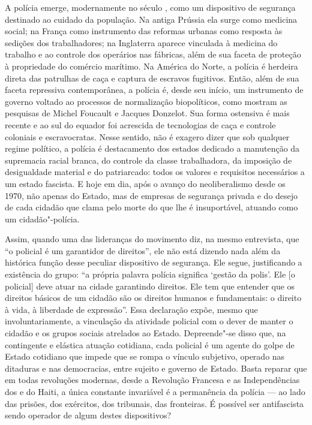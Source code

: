 A polícia emerge, modernamente no século , como um dispositivo de segurança destinado ao cuidado da população. Na antiga Prússia ela surge como medicina social; na França como instrumento das reformas urbanas como resposta às sedições dos trabalhadores; na Inglaterra aparece vinculada à medicina do trabalho e ao controle dos operários nas fábricas, além de sua faceta de proteção à propriedade do comércio marítimo. Na América do Norte, a polícia é herdeira direta das patrulhas de caça e captura de escravos fugitivos. Então, além de sua faceta repressiva contemporânea, a polícia é, desde seu início, um instrumento de governo voltado ao processos de normalização biopolíticos, como mostram as pesquisas de Michel Foucault e Jacques Donzelot. Sua forma ostensiva é mais recente e ao sul do equador foi acrescida de tecnologias de caça e controle coloniais e escravocratas. Nesse sentido, não é exagero dizer que sob qualquer regime político, a polícia é destacamento dos estados dedicado a manutenção da supremacia racial branca, do controle da classe trabalhadora, da imposição de desigualdade material e do patriarcado: todos os valores e requisitos necessários a um estado fascista. E hoje em dia, após o avanço do neoliberalismo desde os 1970, não apenas do Estado, mas de empresas de segurança privada e do desejo de cada cidadão que clama pelo morte do que lhe é insuportável, atuando como um cidadão"-polícia.

Assim, quando uma das lideranças do movimento diz, na mesmo entrevista, que ``o policial é um garantidor de direitos'', ele não está dizendo nada além da histórica função desse peculiar dispositivo de segurança. Ele segue, justificando a existência do grupo: ``a própria palavra polícia significa `gestão da polis'. Ele [o policial] deve atuar na cidade garantindo direitos. Ele tem que entender que os direitos básicos de um cidadão são os direitos humanos e fundamentais: o direito à vida, à liberdade de expressão''. Essa declaração expõe, mesmo que involuntariamente, a vinculação da atividade policial com o dever de manter o cidadão e os grupos sociais atrelados ao Estado. Depreende"-se disso que, na contingente e elástica atuação cotidiana, cada policial é um agente do golpe de Estado cotidiano que impede que se rompa o vínculo subjetivo, operado nas ditaduras e nas democracias, entre sujeito e governo de Estado. Basta reparar que em todas revoluções modernas, desde a Revolução Francesa e as Independências dos  e do Haiti, a única constante invariável é a permanência da polícia --- ao lado das prisões, dos exércitos, dos tribunais, das fronteiras. É possível ser antifascista sendo operador de algum destes dispositivos?

